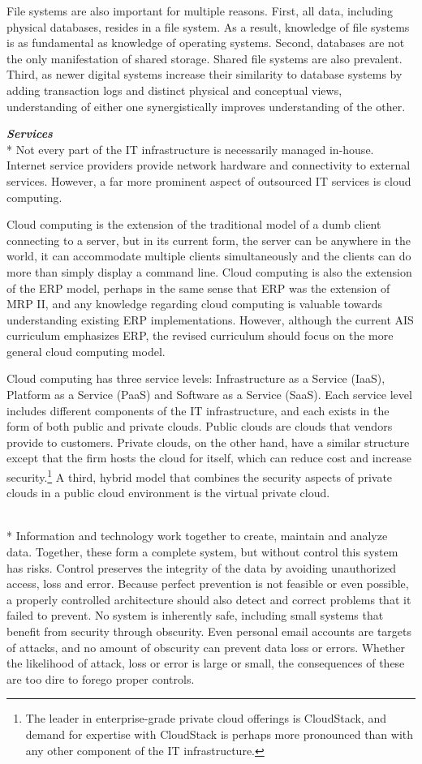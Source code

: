 \documentclass[12pt]{article}
\newcommand{\SubSection}[1]{\vspace{.15in}{\centering{}\normalsize{}\textbf{#1}}\\*\indent{}}
\newcommand{\SubSubSection}[1]{{\centering{}\normalsize{}\textbf{\emph{#1}}}\\*\indent{}}
\begin{document}
File systems are also important for multiple reasons. First, all data, including physical databases, resides in a file system. As a result, knowledge of file systems is as fundamental as knowledge of operating systems. Second, databases are not the only manifestation of shared storage. Shared file systems are also prevalent. Third, as newer digital systems increase their similarity to database systems by adding transaction logs and distinct physical and conceptual views, understanding of either one synergistically improves understanding of the other.

\SubSubSection{Services}
Not every part of the IT infrastructure is necessarily managed in-house. Internet service providers provide network hardware and connectivity to external services. However, a far more prominent aspect of outsourced IT services is cloud computing.

Cloud computing is the extension of the traditional model of a dumb client connecting to a server, but in its current form, the server can be anywhere in the world, it can accommodate multiple clients simultaneously and the clients can do more than simply display a command line. Cloud computing is also the extension of the ERP model, perhaps in the same sense that ERP was the extension of MRP II, and any knowledge regarding cloud computing is valuable towards understanding existing ERP implementations. However, although the current AIS curriculum emphasizes ERP, the revised curriculum should focus on the more general cloud computing model.

Cloud computing has three service levels: Infrastructure as a Service (IaaS), Platform as a Service (PaaS) and Software as a Service (SaaS). Each service level includes different components of the IT infrastructure, and each exists in the form of both public and private clouds. Public clouds are clouds that vendors provide to customers. Private clouds, on the other hand, have a similar structure except that the firm hosts the cloud for itself, which can reduce cost and increase security.\footnote{The leader in enterprise-grade private cloud offerings is CloudStack, and demand for expertise with CloudStack is perhaps more pronounced than with any other component of the IT infrastructure.} A third, hybrid model that combines the security aspects of private clouds in a public cloud environment is the virtual private cloud.

\SubSection{Control}
Information and technology work together to create, maintain and analyze data. Together, these form a complete system, but without control this system has risks. Control preserves the integrity of the data by avoiding unauthorized access, loss and error. Because perfect prevention is not feasible or even possible, a properly controlled architecture should also detect and correct problems that it failed to prevent. No system is inherently safe, including small systems that benefit from security through obscurity. Even personal email accounts are targets of attacks, and no amount of obscurity can prevent data loss or errors. Whether the likelihood of attack, loss or error is large or small, the consequences of these are too dire to forego proper controls.
\end{document}
